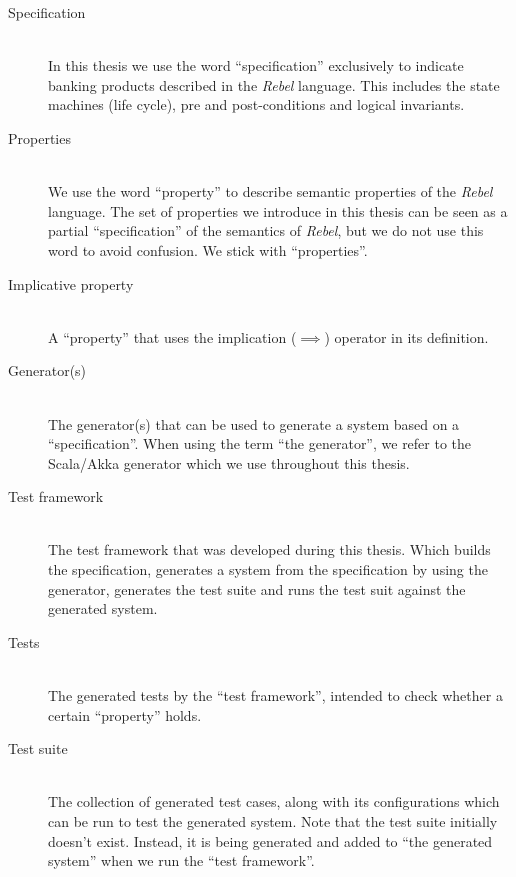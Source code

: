 \begin{description}
\item[Specification]\hfill\\
In this thesis we use the word ``specification'' exclusively to indicate
banking products described in the \textit{Rebel} language. This includes the
state machines (life cycle), pre and post-conditions and logical invariants.

\item[Properties]\hfill\\
We use the word ``property'' to describe semantic properties of the
\textit{Rebel} language. The set of properties we introduce in this thesis can
be seen as a partial ``specification'' of the semantics of \textit{Rebel}, but
we do not use this word to avoid confusion. We stick with ``properties''.

\item[Implicative property]\hfill\\
A ``property'' that uses the implication ($\implies$) operator in its
definition.

\item[Generator(s)]\hfill\\
The generator(s) that can be used to generate a system based on a
``specification''. When using the term ``the generator'', we refer to the
Scala/Akka generator which we use throughout this thesis.

\item[Test framework]\hfill\\
The test framework that was developed during this thesis. Which builds the
specification, generates a system from the specification by using the generator,
generates the test suite and runs the test suit against the generated system.


\item[Tests]\hfill\\
The generated tests by the ``test framework'', intended to check whether a
certain ``property'' holds.

\item[Test suite]\hfill\\
The collection of generated test cases, along with its configurations which can
be run to test the generated system. Note that the test suite initially doesn't
exist. Instead, it is being generated and added to ``the generated system'' when
we run the ``test framework''.


\end{description}
